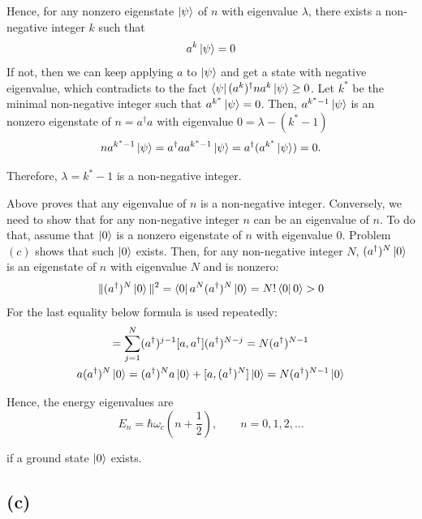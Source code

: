 \documentclass[a4paper,11pt]{article}
\begin{document}
Hence, for any nonzero eigenstate $\ket{\psi}$ of $n$ with eigenvalue $\lambda$, there exists a non-negative integer $k$ such that
\begin{equation}
  a^k\ket{\psi} = 0
\end{equation}
If not, then we can keep applying $a$ to $\ket{\psi}$ and get a state with negative eigenvalue, which contradicts to the fact $\bra{\psi}(a^k)^\dagger n a^k\ket{\psi} \geq 0$. Let $k^*$ be the minimal non-negative integer such that $a^{k^*} \ket{\psi} = 0$. Then, $a^{k^* - 1} \ket{\psi}$ is an nonzero eigenstate of $n = a^\dagger a$ with eigenvalue $0=\lambda - (k^* - 1)$
\begin{equation}
  n a^{k^* - 1} \ket{\psi} = a^\dagger a a^{k^* - 1} \ket{\psi} = a^\dagger(a^{k^*} \ket{\psi}) = 0.
\end{equation}

Therefore, $\lambda = k^* - 1$ is a non-negative integer.

Above proves that any eigenvalue of $n$ is a non-negative integer. Conversely, we need to show that for any non-negative integer $n$ can be an eigenvalue of $n$. To do that, assume that $\ket{0}$ is a nonzero eigenstate of $n$ with eigenvalue $0$. Problem $(c)$ shows that such $\ket{0}$ exists. Then, for any non-negative integer $N$, $(a^\dagger)^N \ket{0}$ is an eigenstate of $n$ with eigenvalue $N$ and is nonzero:
\begin{align}
  \| (a^\dagger)^N \ket{0}\|^2 = \bra{0} a^N (a^\dagger)^N \ket{0} = N! \bra{0} 0 \rangle > 0 \label{eq:norm-n}
\end{align}
For the last equality below formula is used repeatedly:
\begin{gather}
  [a, (a^\dagger)^N] = \sum_{j=1}^{N}(a^\dagger)^{j-1}[a, a^\dagger](a^\dagger)^{N-j} = N(a^{\dagger})^{N-1} \label{eq:comm-a-adaggerN}\\
  a (a^\dagger)^N \ket{0} = (a^\dagger)^N a \ket{0} + [a, (a^\dagger)^N] \ket{0} = N (a^\dagger)^{N-1} \ket{0}
\end{gather}

Hence, the energy eigenvalues are
\begin{equation}
  E_n = \hbar \omega_c \left( n + \frac{1}{2} \right),\qquad n = 0, 1, 2, \ldots
\end{equation}

if a ground state $\ket{0}$ exists.



\subsection{(c)}
\end{document}

